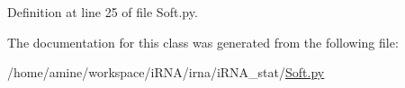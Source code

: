 \-Definition at line 25 of file \-Soft.\-py.



\-The documentation for this class was generated from the following file\-:\begin{DoxyCompactItemize}
\item 
/home/amine/workspace/i\-R\-N\-A/irna/i\-R\-N\-A\-\_\-stat/\hyperlink{Soft_8py}{\-Soft.\-py}\end{DoxyCompactItemize}
